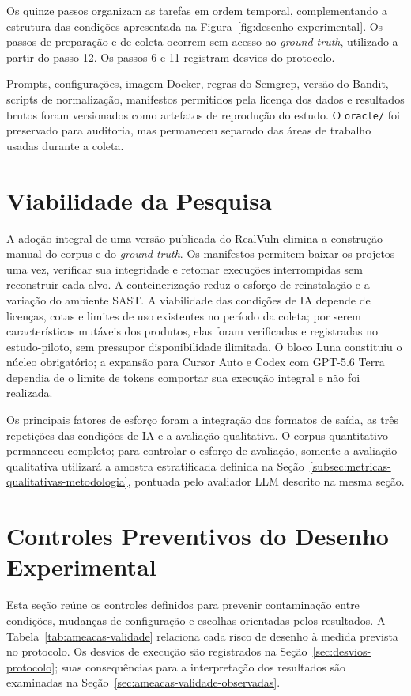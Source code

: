 Os quinze passos organizam as tarefas em ordem temporal, complementando a estrutura das condições apresentada na Figura~\ref{fig:desenho-experimental}. Os passos de preparação e de coleta ocorrem sem acesso ao \textit{ground truth}, utilizado a partir do passo 12. Os passos 6 e 11 registram desvios do protocolo.

Prompts, configurações, imagem Docker, regras do Semgrep, versão do Bandit, scripts de normalização, manifestos permitidos pela licença dos dados e resultados brutos foram versionados como artefatos de reprodução do estudo. O \texttt{oracle/} foi preservado para auditoria, mas permaneceu separado das áreas de trabalho usadas durante a coleta.

\section{Viabilidade da Pesquisa}\label{sec:viabilidade-pesquisa}

A adoção integral de uma versão publicada do RealVuln elimina a construção manual do corpus e do \textit{ground truth}. Os manifestos permitem baixar os projetos uma vez, verificar sua integridade e retomar execuções interrompidas sem reconstruir cada alvo. A conteinerização reduz o esforço de reinstalação e a variação do ambiente SAST. A viabilidade das condições de IA depende de licenças, cotas e limites de uso existentes no período da coleta; por serem características mutáveis dos produtos, elas foram verificadas e registradas no estudo-piloto, sem pressupor disponibilidade ilimitada. O bloco Luna constituiu o núcleo obrigatório; a expansão para Cursor Auto e Codex com GPT-5.6 Terra dependia de o limite de tokens comportar sua execução integral e não foi realizada.

Os principais fatores de esforço foram a integração dos formatos de saída, as três repetições das condições de IA e a avaliação qualitativa. O corpus quantitativo permaneceu completo; para controlar o esforço de avaliação, somente a avaliação qualitativa utilizará a amostra estratificada definida na Seção~\ref{subsec:metricas-qualitativas-metodologia}, pontuada pelo avaliador LLM descrito na mesma seção.

\section{Controles Preventivos do Desenho Experimental}\label{sec:validade-limitacoes}

Esta seção reúne os controles definidos para prevenir contaminação entre condições, mudanças de configuração e escolhas orientadas pelos resultados. A Tabela~\ref{tab:ameacas-validade} relaciona cada risco de desenho à medida prevista no protocolo. Os desvios de execução são registrados na Seção~\ref{sec:desvios-protocolo}; suas consequências para a interpretação dos resultados são examinadas na Seção~\ref{sec:ameacas-validade-observadas}.

